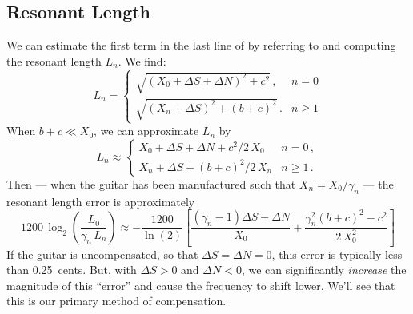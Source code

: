  \subsection{Resonant Length}
We can estimate the first term in the last line of  by referring to  and computing the resonant length $L_n$. We find:
 \begin{equation}  \label{eqn:l_n_def}
L_n = \begin{cases}
\sqrt{\left(X_0 + \Delta S + \Delta N\right)^2 + c^2}\, , & n =  0 \\
\sqrt{\left(X_n + \Delta S\right)^2 + (b + c)^2}\, . & n \ge 1
 \end{cases}
 \end{equation}
When $b + c \ll X_0$, we can approximate $L_n$ by
 \begin{equation} \label{eqn:l_n_approx}
L_n \approx \begin{cases}
X_0 + \Delta S + \Delta N + c^2/2\, X_0 & n =  0\, , \\
X_n + \Delta S + (b + c)^2/2\, X_n & n \ge 1\, .
 \end{cases}
 \end{equation}
Then --- when the guitar has been manufactured such that $X_n = X_0 / \gamma_n$ --- the resonant length error is approximately
  \begin{equation} \label{eqn:rle_approx}
  1200\, \log_2 \left( \frac{L_0}{\gamma_n\, L_n} \right) \approx -\frac{1200}{\ln(2)} \left[ \frac{\left(\gamma_n - 1\right) \Delta S - \Delta N}{X_0} + \frac{\gamma_n^2 (b + c)^2 - c^2}{2\, X_0^2}\right]
  \end{equation}
If the guitar is uncompensated, so that $\Delta S = \Delta N = 0$, this error is typically less than 0.25~cents. But, with $\Delta S > 0$ and $\Delta N < 0$, we can significantly \emph{increase} the magnitude of this ``error'' and cause the frequency to shift lower. We'll see that this is our primary method of compensation. 

